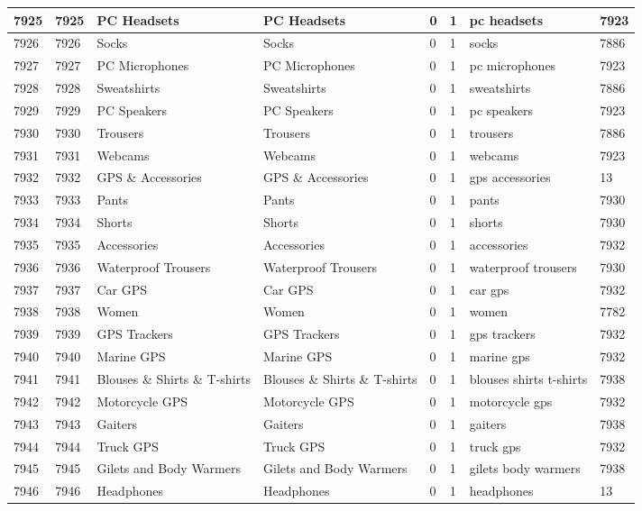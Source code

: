 \begin{longtable}{|l|l|l|l|l|l|l|l|}
7925 & 7925 & PC Headsets & PC Headsets & 0 & 1 & pc headsets & 7923 \\ \hline 
7926 & 7926 & Socks & Socks & 0 & 1 & socks & 7886 \\ \hline 
7927 & 7927 & PC Microphones & PC Microphones & 0 & 1 & pc microphones & 7923 \\ \hline 
7928 & 7928 & Sweatshirts & Sweatshirts & 0 & 1 & sweatshirts & 7886 \\ \hline 
7929 & 7929 & PC Speakers & PC Speakers & 0 & 1 & pc speakers & 7923 \\ \hline 
7930 & 7930 & Trousers & Trousers & 0 & 1 & trousers & 7886 \\ \hline 
7931 & 7931 & Webcams & Webcams & 0 & 1 & webcams & 7923 \\ \hline 
7932 & 7932 & GPS \& Accessories & GPS \& Accessories & 0 & 1 & gps accessories & 13 \\ \hline 
7933 & 7933 & Pants & Pants & 0 & 1 & pants & 7930 \\ \hline 
7934 & 7934 & Shorts & Shorts & 0 & 1 & shorts & 7930 \\ \hline 
7935 & 7935 & Accessories & Accessories & 0 & 1 & accessories & 7932 \\ \hline 
7936 & 7936 & Waterproof Trousers & Waterproof Trousers & 0 & 1 & waterproof trousers & 7930 \\ \hline 
7937 & 7937 & Car GPS & Car GPS & 0 & 1 & car gps & 7932 \\ \hline 
7938 & 7938 & Women & Women & 0 & 1 & women & 7782 \\ \hline 
7939 & 7939 & GPS Trackers & GPS Trackers & 0 & 1 & gps trackers & 7932 \\ \hline 
7940 & 7940 & Marine GPS & Marine GPS & 0 & 1 & marine gps & 7932 \\ \hline 
7941 & 7941 & Blouses \& Shirts \& T-shirts & Blouses \& Shirts \& T-shirts & 0 & 1 & blouses shirts t-shirts & 7938 \\ \hline 
7942 & 7942 & Motorcycle GPS & Motorcycle GPS & 0 & 1 & motorcycle gps & 7932 \\ \hline 
7943 & 7943 & Gaiters & Gaiters & 0 & 1 & gaiters & 7938 \\ \hline 
7944 & 7944 & Truck GPS & Truck GPS & 0 & 1 & truck gps & 7932 \\ \hline 
7945 & 7945 & Gilets and Body Warmers & Gilets and Body Warmers & 0 & 1 & gilets body warmers & 7938 \\ \hline 
7946 & 7946 & Headphones & Headphones & 0 & 1 & headphones & 13 \\ \hline 

\end{longtable}
